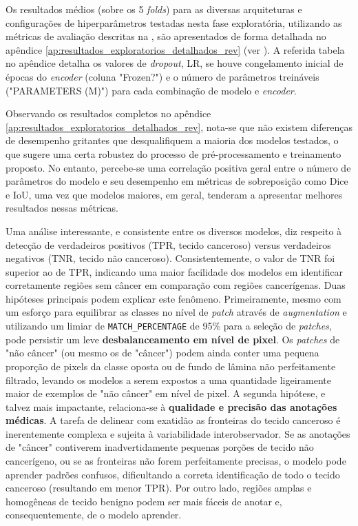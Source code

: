 Os resultados médios (sobre os 5 \textit{folds}) para as diversas arquiteturas e configurações de hiperparâmetros testadas nesta fase exploratória, utilizando as métricas de avaliação descritas na , são apresentados de forma detalhada no apêndice \ref{ap:resultados_exploratorios_detalhados_rev} (ver ). A referida tabela no apêndice detalha os valores de \textit{dropout}, LR, se houve congelamento inicial de épocas do \textit{encoder} (coluna "Frozen?") e o número de parâmetros treináveis ("PARAMETERS (M)") para cada combinação de modelo e \textit{encoder}.

Observando os resultados completos no apêndice \ref{ap:resultados_exploratorios_detalhados_rev}, nota-se que não existem diferenças de desempenho gritantes que desqualifiquem a maioria dos modelos testados, o que sugere uma certa robustez do processo de pré-processamento e treinamento proposto. No entanto, percebe-se uma correlação positiva geral entre o número de parâmetros do modelo e seu desempenho em métricas de sobreposição como Dice e IoU, uma vez que modelos maiores, em geral, tenderam a apresentar melhores resultados nessas métricas.

Uma análise interessante, e consistente entre os diversos modelos, diz respeito à detecção de verdadeiros positivos (TPR, tecido canceroso) versus verdadeiros negativos (TNR, tecido não canceroso). Consistentemente, o valor de TNR foi superior ao de TPR, indicando uma maior facilidade dos modelos em identificar corretamente regiões sem câncer em comparação com regiões cancerígenas. Duas hipóteses principais podem explicar este fenômeno. Primeiramente, mesmo com um esforço para equilibrar as classes no nível de \textit{patch} através de \textit{augmentation} e utilizando um limiar de \texttt{MATCH\_PERCENTAGE} de 95\% para a seleção de \textit{patches}, pode persistir um leve \textbf{desbalanceamento em nível de pixel}. Os \textit{patches} de "não câncer" (ou mesmo os de "câncer") podem ainda conter uma pequena proporção de pixels da classe oposta ou de fundo de lâmina não perfeitamente filtrado, levando os modelos a serem expostos a uma quantidade ligeiramente maior de exemplos de "não câncer" em nível de pixel. A segunda hipótese, e talvez mais impactante, relaciona-se à \textbf{qualidade e precisão das anotações médicas}. A tarefa de delinear com exatidão as fronteiras do tecido canceroso é inerentemente complexa e sujeita à variabilidade interobservador. Se as anotações de "câncer" contiverem inadvertidamente pequenas porções de tecido não cancerígeno, ou se as fronteiras não forem perfeitamente precisas, o modelo pode aprender padrões confusos, dificultando a correta identificação de todo o tecido canceroso (resultando em menor TPR). Por outro lado, regiões amplas e homogêneas de tecido benigno podem ser mais fáceis de anotar e, consequentemente, de o modelo aprender.

